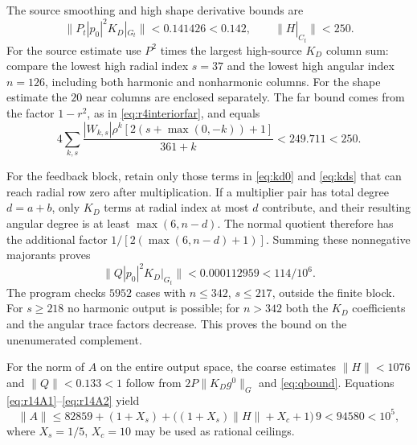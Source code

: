 \documentclass[11pt]{amsart}
\theoremstyle{remark}
\numberwithin{equation}{section}
\newcommand{\norm}[1]{\lVert#1\rVert}
\newcommand{\Pt}{P_t}
\begin{document}
The source smoothing and high shape derivative bounds are
\begin{equation}\label{eq:r14smallblocks}
 \norm{\Pt|p_0|^2K_D|_{G_t}}<0.141426<0.142,\qquad
 \norm{H|_{C_t}}<250.
\end{equation}
For the source estimate use $P^2$ times the largest high-source $K_D$
column sum: compare the lowest high radial index $s=37$ and the lowest
high angular index $n=126$, including both harmonic and nonharmonic
columns. For the shape estimate the $20$ near columns are enclosed
separately. The far bound comes from the factor $1-r^2$, as in
\eqref{eq:r4interiorfar}, and equals
\[
 4\sum_{k,s}\frac{|W_{k,s}|\rho^k
                 [2(s+\max(0,-k))+1]}{361+k}<249.711<250.
\]

For the feedback block, retain only those terms in \eqref{eq:kd0} and
\eqref{eq:kds} that can reach radial row zero after multiplication.
If a multiplier pair has total degree $d=a+b$, only $K_D$ terms at
radial index at most $d$ contribute, and their resulting angular degree
is at least $\max(6,n-d)$. The normal quotient therefore has the
additional factor $1/[2(\max(6,n-d)+1)]$. Summing these nonnegative
majorants proves
\begin{equation}\label{eq:r14QD}
 \norm{Q|p_0|^2K_D|_{G_t}}<0.000112959<114/10^6.
\end{equation}
The program checks $5952$ cases with $n\le342$, $s\le217$, outside the
finite block. For $s\ge218$ no harmonic output is possible; for
$n>342$ both the $K_D$ coefficients and the angular trace factors
decrease. This proves the bound on the unenumerated complement.

For the norm of $A$ on the entire output space, the coarse estimates
$\norm H<1076$ and $\norm Q<0.133<1$ follow from
$2P\norm{K_Dg^0}_G$ and \eqref{eq:qbound}.
Equations \eqref{eq:r14A1}--\eqref{eq:r14A2} yield
\begin{equation}\label{eq:r14Anorm}
 \norm A\le82859+(1+X_s)
       +\bigl((1+X_s)\norm H+X_c+1\bigr)\,9
       <94580<10^5,
\end{equation}
where $X_s=1/5$, $X_c=10$ may be used as rational ceilings.
\end{document}
